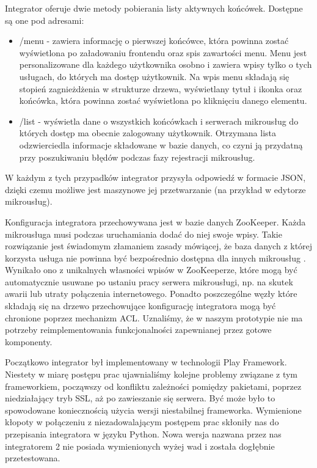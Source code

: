 \documentclass[licencjacka]{pracamgr}
\begin{document}
Integrator oferuje dwie metody pobierania listy aktywnych końcówek. Dostępne są
one pod adresami:
\begin{itemize}
	\item /menu - zawiera informację o pierwszej końcówce, która powinna zostać
	wyświetlona po załadowaniu frontendu oraz spis zawartości menu. Menu jest
	personalizowane dla każdego użytkownika osobno i zawiera wpisy tylko o tych
	usługach, do których ma dostęp użytkownik. Na wpis menu składają się stopień
	zagnieżdżenia w strukturze drzewa, wyświetlany tytuł i ikonka oraz końcówka,
	która powinna zostać wyświetlona po kliknięciu danego elementu.
	\item /list - wyświetla dane o wszystkich końcówkach i serwerach mikrousług
	do których dostęp ma obecnie zalogowany użytkownik. Otrzymana lista odzwierciedla
	informacje składowane w bazie danych, co czyni ją przydatną przy poszukiwaniu
	błędów podczas fazy rejestracji mikrousług.
\end{itemize}
W każdym z tych przypadków integrator przysyła odpowiedź w formacie JSON, dzięki
czemu możliwe jest maszynowe jej przetwarzanie (na przykład w edytorze mikrousług).

Konfiguracja integratora przechowywana jest w bazie danych ZooKeeper. Każda
mikrousługa musi podczas uruchamiania dodać do niej swoje wpisy. Takie rozwiązanie
jest świadomym złamaniem zasady mówiącej, że baza danych z której korzysta usługa
nie powinna być bezpośrednio dostępna dla innych mikrousług \cite{microsvc}.
Wynikało ono z unikalnych własności wpisów w ZooKeeperze, które mogą być automatycznie
usuwane po ustaniu pracy serwera mikrousługi, np. na skutek awarii lub utraty
połączenia internetowego. Ponadto poszczególne węzły które składają się na drzewo
przechowujące konfigurację integratora mogą być chronione poprzez mechanizm ACL.
Uznaliśmy, że w naszym prototypie nie ma potrzeby reimplementowania funkcjonalności
zapewnianej przez gotowe komponenty.

Początkowo integrator był implementowany w technologii Play Framework. Niestety
w miarę postępu prac ujawnialiśmy kolejne problemy związane z tym frameworkiem,
począwszy od konfliktu zależności pomiędzy pakietami, poprzez niedziałający tryb
SSL, aż po zawieszanie się serwera. Być może było to spowodowane koniecznością
użycia wersji niestabilnej frameworka. Wymienione kłopoty w połączeniu z niezadowalającym
postępem prac skłoniły nas do przepisania integratora w języku Python. Nowa wersja
nazwana przez nas integratorem 2 nie posiada wymienionych wyżej wad i została
dogłębnie przetestowana.
\end{document}
